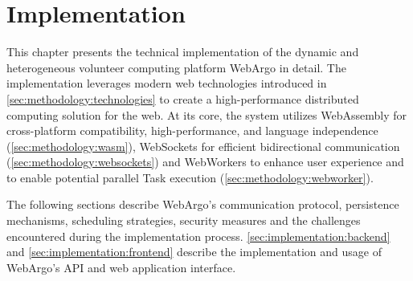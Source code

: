 \chapter{Implementation}
\label{ch:implementation}
This chapter presents the technical implementation of the dynamic and heterogeneous volunteer computing platform WebArgo in detail. The implementation leverages modern web technologies introduced in \autoref{sec:methodology:technologies} to create a high-performance distributed computing solution for the web. At its core, the system utilizes WebAssembly for cross-platform compatibility, high-performance, and language independence (\autoref{sec:methodology:wasm}), WebSockets for efficient bidirectional communication (\autoref{sec:methodology:websockets}) and WebWorkers to enhance user experience and to enable potential parallel Task execution (\autoref{sec:methodology:webworker}).

The following sections describe WebArgo's communication protocol, persistence mechanisms, scheduling strategies, security measures and the challenges encountered during the implementation process. \autoref{sec:implementation:backend} and \autoref{sec:implementation:frontend} describe the implementation and usage of WebArgo's \ac{API} and web application interface.

